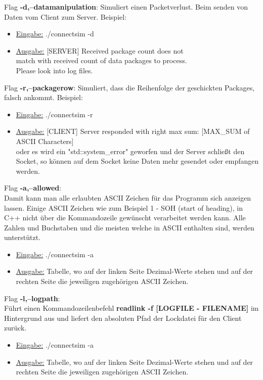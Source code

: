 \documentclass{article}
\begin{document}
Flag \textbf{-d,--datamanipulation}:\newline
Simuliert einen Packetverlust. Beim senden von Daten vom Client zum Server.
Beispiel: 
\begin{itemize}
	\item \underline{Eingabe:} ./connectsim -d
	\item \underline{Ausgabe:} [SERVER] Received package count does not\\ match with received count of data packages to process.
	\\ Please look into log files.\\
\end{itemize}

Flag \textbf{-r,--packagerow}:\newline
Simuliert, dass die Reihenfolge der geschickten Packages, falsch ankommt.
Beispiel: 
\begin{itemize}
	\item \underline{Eingabe:} ./connectsim -r
	\item \underline{Ausgabe:} [CLIENT] Server responded with right max sum: [MAX\_SUM of ASCII Characters]\\ oder
	es wird ein "std::system\_error" geworfen und der Server schließt den Socket, so können auf dem Socket keine Daten mehr
	gesendet oder empfangen werden.
\end{itemize}

\break

Flag \textbf{-a,--allowed}:\\
Damit kann man alle erlaubten ASCII Zeichen für das Programm sich anzeigen lassen. Einige ASCII Zeichen wie zum Beispiel 1 - SOH (start of heading), in C++ nicht über die Kommandozeile gewünscht verarbeitet werden kann. Alle Zahlen und Buchstaben und die meisten welche in ASCII enthalten sind, werden unterstützt.

\begin{itemize}
	\item \underline{Eingabe:} ./connectsim -a
	\item \underline{Ausgabe:} Tabelle, wo auf der linken Seite Dezimal-Werte stehen und auf der rechten Seite die jeweiligen zugehörigen ASCII Zeichen.\\
\end{itemize}

Flag \textbf{-l,--logpath}:\\
Führt einen Kommandozeilenbefehl \textbf{readlink -f [LOGFILE - FILENAME]} im Hintergrund aus und liefert
den absoluten Pfad der Lockdatei für den Client zurück.
\begin{itemize}
	\item \underline{Eingabe:} ./connectsim -a
	\item \underline{Ausgabe:} Tabelle, wo auf der linken Seite Dezimal-Werte stehen und auf der rechten Seite die jeweiligen zugehörigen ASCII Zeichen.\\
\end{itemize}
\end{document}
